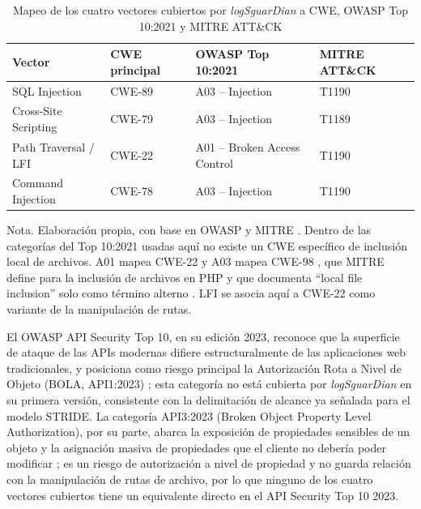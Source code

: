 \begin{table}[H]
\centering
\small
\begin{tabular}{|L{3.4cm}|L{2.2cm}|L{4.4cm}|L{2.4cm}|}
\hline
\textbf{Vector} & \textbf{CWE principal} & \textbf{OWASP Top 10:2021} & \textbf{MITRE ATT\&CK} \\ \hline
SQL Injection & CWE-89 & A03 -- Injection & T1190 \\ \hline
Cross-Site Scripting & CWE-79 & A03 -- Injection & T1189 \\ \hline
Path Traversal / LFI & CWE-22 & A01 -- Broken Access Control & T1190 \\ \hline
Command Injection & CWE-78 & A03 -- Injection & T1190 \\ \hline
\end{tabular}
\caption[Mapeo de vectores a CWE, OWASP Top 10 y MITRE ATT\&CK]{Mapeo de los cuatro vectores cubiertos por \textit{logSguarDian} a CWE, OWASP Top 10:2021 y MITRE ATT\&CK}
\label{cuadro:owasp-mitre-cwe}
\end{table}
\vspace{-0.3cm}
{\footnotesize Nota. Elaboración propia, con base en OWASP \cite{owaspa01_2021, owaspa03_2021} y MITRE \cite{mitret1189, mitret1190}. Dentro de las categorías del Top 10:2021 usadas aquí no existe un CWE específico de inclusión local
de archivos. A01 mapea CWE-22 \cite{owaspa01_2021} y A03 mapea CWE-98 \cite{owaspa03_2021}, que
MITRE define para la inclusión de archivos en PHP y que documenta ``local file inclusion'' solo como
término alterno \cite{mitre2026cwe98}. LFI se asocia aquí a CWE-22 \cite{mitre2026cwe22} como
variante de la manipulación de rutas.}

El OWASP API Security Top 10, en su edición 2023, reconoce que la superficie de ataque de las
APIs modernas difiere estructuralmente de las aplicaciones web tradicionales, y posiciona como
riesgo principal la Autorización Rota a Nivel de Objeto (BOLA, API1:2023) \cite{owaspapi2023};
esta categoría no está cubierta por \textit{logSguarDian} en su primera versión, consistente con
la delimitación de alcance ya señalada para el modelo STRIDE. La categoría API3:2023 (Broken
Object Property Level Authorization), por su parte, abarca la exposición de propiedades sensibles
de un objeto y la asignación masiva de propiedades que el cliente no debería poder modificar
\cite{owaspapi3_2023}; es un riesgo de autorización a nivel de propiedad y no guarda relación con
la manipulación de rutas de archivo, por lo que ninguno de los cuatro vectores cubiertos tiene un
equivalente directo en el API Security Top 10 2023.

